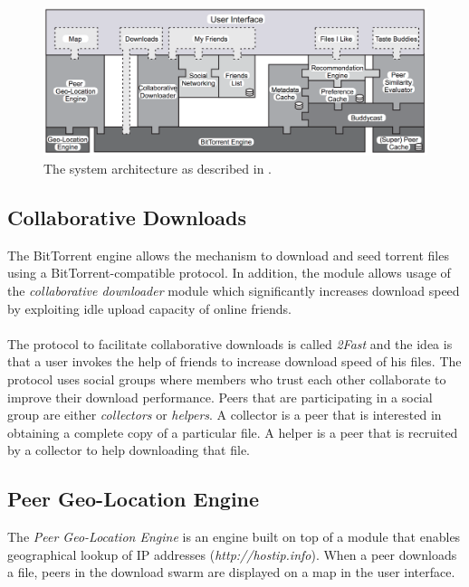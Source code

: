 \begin{figure}[t]
	\centering
	\includegraphics[width=0.9\columnwidth]{images/tribler_architecture_2007}
	\caption{The system architecture as described in \cite{pouwelse2008tribler}.}
	\label{fig:tribler-architecture-2008}
\end{figure}

\subsection{Collaborative Downloads}
The BitTorrent engine allows the mechanism to download and seed torrent files using a BitTorrent-compatible protocol. In addition, the module allows usage of the \emph{collaborative downloader} module which significantly increases download speed by exploiting idle upload capacity of online friends.\\\\
The protocol to facilitate collaborative downloads is called \emph{2Fast} and the idea is that a user invokes the help of friends to increase download speed of his files. The protocol uses social groups where members who trust each other collaborate to improve their download performance. Peers that are participating in a social group are either \emph{collectors} or \emph{helpers}. A collector is a peer that is interested in obtaining a complete copy of a particular file. A helper is a peer that is recruited by a collector to help downloading that file.

\subsection{Peer Geo-Location Engine}
The \emph{Peer Geo-Location Engine} is an engine built on top of a module that enables geographical lookup of IP addresses (\emph{http://hostip.info}). When a peer downloads a file, peers in the download swarm are displayed on a map in the user interface.

